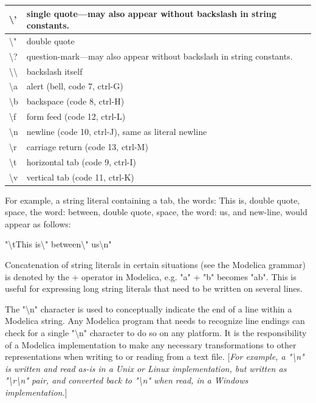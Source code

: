 \documentclass[10pt,a4paper]{report}
\begin{document}
\begin{longtable}[c]{@{}ll@{}}
\textbackslash{}' & single quote---may also appear without backslash in
string constants.\\ \hline
\textbackslash{}" & double quote\\ \hline
\textbackslash{}? & question-mark---may also appear without backslash in
string constants.\\ \hline
\textbackslash{}\textbackslash{} & backslash itself\\ \hline
\textbackslash{}a & alert (bell, code 7, ctrl-G)\\ \hline
\textbackslash{}b & backspace (code 8, ctrl-H)\\ \hline
\textbackslash{}f & form feed (code 12, ctrl-L)\\ \hline
\textbackslash{}n & newline (code 10, ctrl-J), same as literal
newline\\ \hline
\textbackslash{}r & carriage return (code 13, ctrl-M)\\ \hline
\textbackslash{}t & horizontal tab (code 9, ctrl-I)\\ \hline
\textbackslash{}v & vertical tab (code 11, ctrl-K)\\ \hline
\end{longtable}

For example, a string literal containing a tab, the words: This is,
double quote, space, the word: between, double quote, space, the word:
us, and new-line, would appear as follows:

"\textbackslash{}tThis is\textbackslash{}" between\textbackslash{}"
us\textbackslash{}n"

Concatenation of string literals in certain situations (see the Modelica
grammar) is denoted by the + operator in Modelica, e.g. "a" + "b"
becomes "ab". This is useful for expressing long string literals that
need to be written on several lines.

The "\textbackslash{}n" character is used to conceptually indicate the
end of a line within a Modelica string. Any Modelica program that needs
to recognize line endings can check for a single "\textbackslash{}n"
character to do so on any platform. It is the responsibility of a
Modelica implementation to make any necessary transformations to other
representations when writing to or reading from a text file.
{[}\emph{For example, a "\textbackslash{}n" is written and read as-is in
a Unix or Linux implementation, but written as
"\textbackslash{}r\textbackslash{}n" pair, and converted back to
"\textbackslash{}n" when read, in a Windows implementation.}{]}
\end{document}

